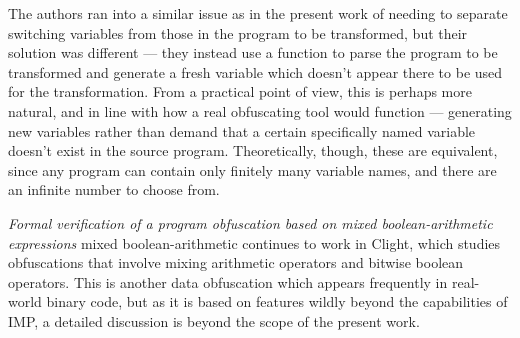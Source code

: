 \documentclass[compsoc,conference,a4paper,10pt,times]{IEEEtran}
\begin{document}
\par The authors ran into a similar issue as in the present work of needing to separate switching variables from those in the program to be transformed, but their solution was different --- they instead use a function to parse the program to be transformed and generate a fresh variable which doesn't appear there to be used for the transformation.  From a practical point of view, this is perhaps more natural, and in line with how a real obfuscating tool would function --- generating new variables rather than demand that a certain specifically named variable doesn't exist in the source program.  Theoretically, though, these are equivalent, since any program can contain only finitely many variable names, and there are an infinite number to choose from.

\par \emph{Formal verification of a program obfuscation based on mixed boolean-arithmetic expressions} \cite{Blazy3} mixed boolean-arithmetic continues to work in Clight, which studies obfuscations that involve mixing arithmetic operators and bitwise boolean operators.  This is another data obfuscation which appears frequently in real-world binary code, but as it is based on features wildly beyond the capabilities of IMP, a detailed discussion is beyond the scope of the present work.
\end{document}
